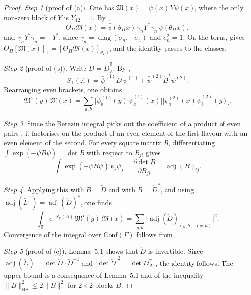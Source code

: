 \documentclass[11pt,letterpaper,reqno]{amsart}
\theoremstyle{definition}
\begin{document}
\begin{proof}
\emph{Step 1} (proof of (a)).
One has $\mathfrak M(x)=\bar\psi(x)\,Y\psi(x)$, where the only non-zero block of $Y$ is $Y_{12}=1$.
By \cite[Lemma~3.10\,(c)]{QEDII},
\begin{equation*}
\Theta_\Pi\mathfrak M(x)=\bar\psi(\theta_\Pi x)\,\gamma_nY^*\gamma_n\,\psi(\theta_\Pi x),
\end{equation*}
and $\gamma_nY^*\gamma_n=-Y^*$, since $\gamma_n=\operatorname{diag}(\sigma_n,-\sigma_n)$ and $\sigma_n^2=1$.
On the torus, \cite[Lemma~3.12]{QEDII} gives $\Theta_\Pi[\mathfrak M(x)]_{\mathbb T}=\allowbreak [\Theta_\Pi\mathfrak M(x)]_{\theta_\Pi\mathbb T}$, and the identity passes to the classes.

\emph{Step 2} (proof of (b)).
Write $\check D=\check D^{\mathbb T}_A$.
By \cite[Proposition~3.18\,(d)]{QEDII},
\begin{equation*}
S_{\mathbb T}(A)=\bar\psi^{(1)}\check D\,\psi^{(1)}+\bar\psi^{(2)}\check D^{*}\psi^{(2)}.
\end{equation*}
Rearranging even brackets, one obtains
\begin{equation*}
\mathfrak M^\star(y)\,\mathfrak M(x)=\sum_{a,b}\bigl[\psi^{(1)}_b(y)\,\bar\psi^{(1)}_a(x)\bigr]\bigl[\psi^{(2)}_a(x)\,\bar\psi^{(2)}_b(y)\bigr].
\end{equation*}

\emph{Step 3.}
Since the Berezin integral picks out the coefficient of a product of even pairs \cite[Definition~2.8]{QEDII}, it factorises on the product of an even element of the first flavour with an even element of the second.
For every square matrix $B$, differentiating $\int\exp(-\bar\psi B\psi)=\det B$ with respect to $B_{ji}$ gives
\begin{equation*}
\int\exp(-\bar\psi B\psi)\,\psi_i\bar\psi_j=\frac{\partial\det B}{\partial B_{ji}}=\operatorname{adj}(B)_{ij}.
\end{equation*}

\emph{Step 4.}
Applying this with $B=\check D$ and with $B=\check D^*$, and using $\operatorname{adj}(\check D^*)=\operatorname{adj}(\check D)^*$, one finds
\begin{equation*}
\int_{\mathbb T}e^{-S_{\mathbb T}(A)}\,\mathfrak M^\star(y)\,\mathfrak M(x)=\sum_{a,b}\bigl|\operatorname{adj}(\check D)_{(y,b),(x,a)}\bigr|^2.
\end{equation*}
Convergence of the integral over $\mathrm{Conf}(\Gamma)$ follows from \cite[Lemma~3.13\,(b)]{QEDII}.

\emph{Step 5} (proof of (c)).
Lemma~5.1 shows that $\check D$ is invertible.
Since $\operatorname{adj}(\check D)=\det\check D\cdot\check D^{-1}$ and $|\det\check D|^2=\det D^{\mathbb T}_A$ \cite[Proposition~3.18\,(d)]{QEDII}, the identity follows.
The upper bound is a consequence of Lemma~5.1 and of the inequality $\|B\|_{\mathrm{HS}}^2\le2\|B\|^2$ for $2\times2$ blocks $B$.


\end{proof}
\end{document}
